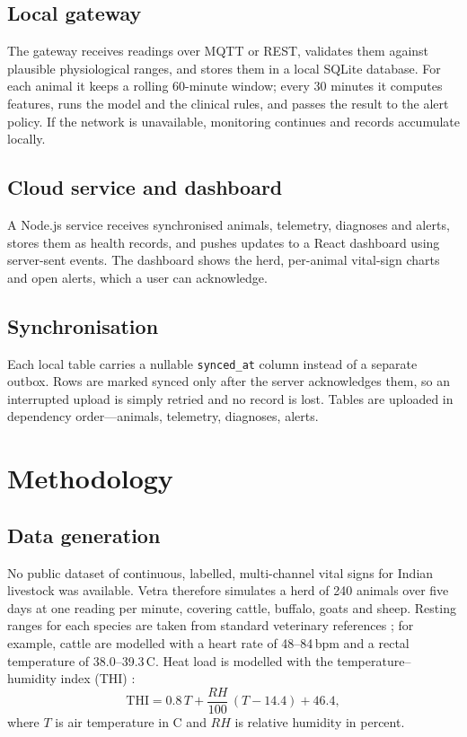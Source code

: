 \documentclass[conference]{IEEEtran}
\begin{document}
\subsection{Local gateway}
The gateway receives readings over MQTT \cite{mqtt311} or REST, validates them
against plausible physiological ranges, and stores them in a local SQLite
database. For each animal it keeps a rolling 60-minute window; every 30 minutes
it computes features, runs the model and the clinical rules, and passes the
result to the alert policy. If the network is unavailable, monitoring continues
and records accumulate locally.

\subsection{Cloud service and dashboard}
A Node.js service receives synchronised animals, telemetry, diagnoses and alerts,
stores them as health records, and pushes updates to a React dashboard using
server-sent events. The dashboard shows the herd, per-animal vital-sign charts
and open alerts, which a user can acknowledge.

\subsection{Synchronisation}
Each local table carries a nullable \texttt{synced\_at} column instead of a
separate outbox. Rows are marked synced only after the server acknowledges
them, so an interrupted upload is simply retried and no record is lost. Tables
are uploaded in dependency order---animals, telemetry, diagnoses, alerts.

\section{Methodology}

\subsection{Data generation}
No public dataset of continuous, labelled, multi-channel vital signs for Indian
livestock was available. Vetra therefore simulates a herd of 240 animals over
five days at one reading per minute, covering cattle, buffalo, goats and sheep.
Resting ranges for each species are taken from standard veterinary references
\cite{merck,jackson2002}; for example, cattle are modelled with a heart rate of
48--84\,bpm and a rectal temperature of 38.0--39.3\,\textdegree C. Heat load is
modelled with the temperature--humidity index (THI) \cite{nrc1971}:
\begin{equation}
\mathrm{THI} = 0.8\,T + \frac{RH}{100}\,(T - 14.4) + 46.4,
\end{equation}
where $T$ is air temperature in \textdegree C and $RH$ is relative humidity in
percent.
\end{document}
